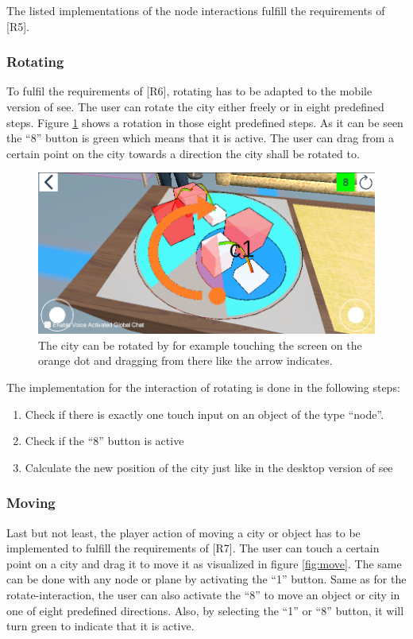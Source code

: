 The listed implementations of the \gls{node} interactions fulfill the requirements of [R5].

\subsubsection{Rotating}
To fulfil the requirements of [R6], rotating has to be adapted to the mobile version of \gls{see}.
The user can rotate the city either freely or in eight predefined steps.
Figure \ref{fig:rotate} shows a rotation in those eight predefined steps.
As it can be seen the \enquote{8} button is green which means that it is active.
The user can drag from a certain point on the \gls{city} towards a direction the \gls{city} shall be rotated to.

\begin{figure}[htb]
    \centering
    \includegraphics[width=1\textwidth]{Implementation/img/rotate.png}
    \caption{The \gls{city} can be rotated by for example touching the screen on the orange dot and dragging from there like the arrow indicates.}\label{fig:rotate}
\end{figure}

The implementation for the interaction of rotating is done in the following steps:
\begin{enumerate}
    \item Check if there is exactly one touch input on an object of the type \enquote{\gls{node}}.
    \item Check if the \enquote{8} button is active
    \item Calculate the new position of the \gls{city} just like in the desktop version of \gls{see}
\end{enumerate}
\subsubsection{Moving}
Last but not least, the player action of moving a \gls{city} or object has to be implemented to fulfill the requirements of [R7].
The user can touch a certain point on a \gls{city} and drag it to move it as visualized in figure \ref{fig:move}.
The same can be done with any \gls{node} or \gls{plane} by activating the \enquote{1} button.
Same as for the rotate-interaction, the user can also activate the \enquote{8} to move an object or city in one of eight predefined directions.
Also, by selecting the \enquote{1} or \enquote{8} button, it will turn green to indicate that it is active.


